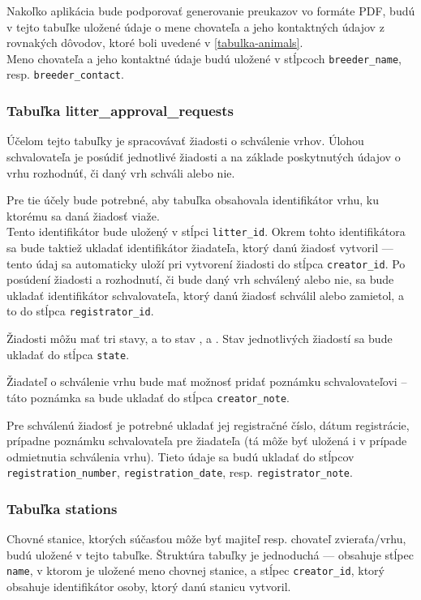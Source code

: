 Nakoľko aplikácia bude podporovať generovanie preukazov vo formáte PDF, budú v tejto tabuľke uložené údaje o mene chovateľa a jeho kontaktných údajov z rovnakých dôvodov, ktoré boli uvedené v \ref{tabulka-animals}. \\ Meno chovateľa
a jeho kontaktné údaje budú uložené v stĺpcoch \texttt{breeder_name}, resp. \texttt{breeder_contact}.

\subsubsection*{Tabuľka litter\_approval\_requests}
Účelom tejto tabuľky je spracovávať žiadosti o schválenie vrhov. Úlohou schvalovateľa je posúdiť jednotlivé žiadosti a na základe poskytnutých údajov o vrhu rozhodnúť, či daný vrh schváli alebo nie.

Pre tie účely bude potrebné, aby tabuľka obsahovala identifikátor vrhu, ku ktorému sa daná žiadosť viaže. \\ Tento identifikátor bude uložený v stĺpci \texttt{litter_id}. Okrem tohto identifikátora sa bude taktiež ukladať identifikátor žiadateľa, ktorý danú žiadosť vytvoril --- tento údaj sa automaticky uloží pri vytvorení žiadosti do stĺpca \texttt{creator_id}. Po posúdení žiadosti a rozhodnutí, či bude daný vrh schválený alebo nie, sa bude ukladať identifikátor schvalovateľa, ktorý danú žiadosť schválil alebo zamietol, a to do stĺpca \texttt{registrator_id}.

Žiadosti môžu mať tri stavy, a to stav ,  a . Stav jednotlivých žiadostí sa bude ukladať do stĺpca \texttt{state}.

Žiadateľ o schválenie vrhu bude mať možnosť pridať poznámku schvalovateľovi -- táto poznámka sa bude ukladať do stĺpca \texttt{creator_note}.

Pre schválenú žiadosť je potrebné ukladať jej registračné číslo, dátum registrácie, prípadne poznámku schvalovateľa pre žiadateľa (tá môže byť uložená i v prípade odmietnutia schválenia vrhu). Tieto údaje sa budú ukladať do stĺpcov \texttt{registration_number}, \texttt{registration_date}, resp. \texttt{registrator_note}.

\subsubsection*{Tabuľka stations}
Chovné stanice, ktorých súčasťou môže byť majiteľ resp. chovateľ zvieraťa/vrhu, budú uložené v tejto tabuľke.
Štruktúra tabuľky je jednoduchá --- obsahuje stĺpec \texttt{name}, v ktorom je uložené meno chovnej stanice, a stĺpec \texttt{creator_id}, ktorý obsahuje identifikátor osoby, ktorý danú stanicu vytvoril.

